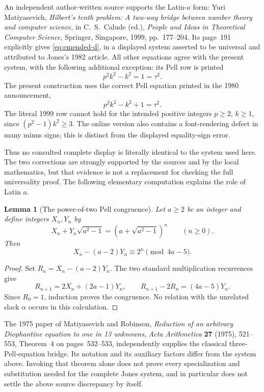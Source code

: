 \documentclass[11pt]{article}
\newtheorem{lemma}[theorem]{Lemma}
\begin{document}
An independent author-written source supports the Latin-$a$ form:
Yuri Matiyasevich, \emph{Hilbert's tenth problem: A two-way bridge between
number theory and computer science}, in C.~S.~Calude (ed.),
\emph{People and Ideas in Theoretical Computer Science}, Springer,
Singapore, 1999, pp.~177--204.  Its page~191 explicitly gives
\eqref{eq:emended-d}, in a displayed system asserted to be universal and
attributed to Jones's 1982 article.  All other equations agree with the
present system, with the following additional exception: its Pell row
is printed
\[
                         p^2k^2-k^2=1=\tau^2.
\]
The present construction uses the correct Pell equation printed in the
1980 announcement,
\begin{equation}\label{eq:emended-tau}
                         p^2k^2-k^2+1=\tau^2.
\end{equation}
The literal 1999 row cannot hold for the intended positive integers
$p\ge2$, $k\ge1$, since $(p^2-1)k^2\ge3$.  The online version also
contains a font-rendering defect in many minus signs; this is distinct
from the displayed equality-sign error.

Thus no consulted complete display is literally identical to the
system used here.  The two corrections are strongly supported by the
sources and by the local mathematics, but that evidence is not a
replacement for checking the full universality proof.  The following
elementary computation explains the role of Latin $a$.

\begin{lemma}[The power-of-two Pell congruence]
Let $a\ge2$ be an integer and define integers $X_n,Y_n$ by
\[
 X_n+Y_n\sqrt{a^2-1}=(a+\sqrt{a^2-1})^n
 \qquad(n\ge0).
\]
Then
\[
             X_n-(a-2)Y_n\equiv2^n\pmod{4a-5}.
\]
\end{lemma}
\begin{proof}
Set $R_n=X_n-(a-2)Y_n$.  The two standard multiplication recurrences
give
\[
 R_{n+1}=2X_n+(2a-1)Y_n,
 \qquad
 R_{n+1}-2R_n=(4a-5)Y_n.
\]
Since $R_0=1$, induction proves the congruence.  No relation with the
unrelated slack $\alpha$ occurs in this calculation.
\end{proof}

The 1975 paper of Matiyasevich and Robinson,
\emph{Reduction of an arbitrary Diophantine equation to one in
13 unknowns}, \emph{Acta Arithmetica} \textbf{27} (1975), 521--553,
Theorem~4 on pages~532--533, independently supplies the classical
three-Pell-equation bridge.  Its notation and its auxiliary factors
differ from the system above.  Invoking that theorem alone does not
prove every specialization and substitution needed for the complete
Jones system, and in particular does not settle the above source
discrepancy by itself.
\end{document}
